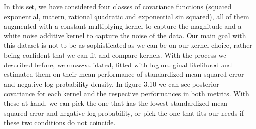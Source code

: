 \documentclass[12pt,a4paper,oneside]{book}
\theoremstyle{plain}
\theoremstyle{definition}
\begin{document}
{In this set, we have considered four classes of covariance functions (squared exponential, matern, rational quadratic and exponential sin squared), all of them augmented with a constant multiplying kernel to capture the magnitude and a white noise additive kernel to capture the noise of the data. Our main goal with this dataset is not to be as sophisticated as we can be on our kernel choice, rather being confident that we can fit and compare kernels. With the process we described before, we cross-validated, fitted with log marginal likelihood and estimated them on their mean performance of standardized mean squared error and negative log probability density. In figure 3.10 we can see posterior covariance for each kernel and the respective performances in both metrics. With these at hand, we can pick the one that has the lowest standardized mean squared error and negative log probability, or pick the one that fits our needs if these two conditions do not coincide.

}
\end{document}
